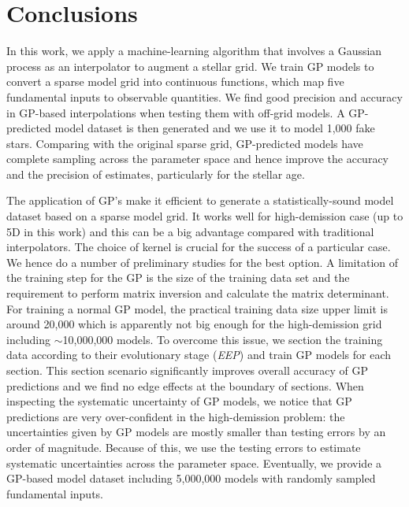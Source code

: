 \section{Conclusions}\label{sec:conclusion}

In this work, we apply a machine-learning algorithm that involves a Gaussian process as an interpolator to augment a stellar grid. We train GP models to convert a sparse model grid into continuous functions, which map five fundamental inputs to observable quantities. We find good precision and accuracy in GP-based interpolations when testing them with off-grid models. A GP-predicted model dataset is then generated and we use it to model 1,000 fake stars. Comparing with the original sparse grid, GP-predicted models have complete sampling across the parameter space and hence improve the accuracy and the precision of estimates, particularly for the stellar age.

The application of GP's make it efficient to generate a statistically-sound model dataset based on a sparse model grid. It works well for high-demission case (up to 5D in this work) and this can be a big advantage compared with traditional interpolators. The choice of kernel is crucial for the success of a particular case. We hence do a number of preliminary studies for the best option. A limitation of the training step for the GP is the size of the training data set and the requirement to perform matrix inversion and calculate the matrix determinant. For training a normal GP model, the practical training data size upper limit is around 20,000 which is apparently not big enough for the high-demission grid including $\sim$10,000,000 models. To overcome this issue, we section the training data according to their evolutionary stage ({\it EEP}) and train GP models for each section. This section scenario significantly improves overall accuracy of GP predictions and we find no edge effects at the boundary of sections. When inspecting the systematic uncertainty of GP models, we notice that GP predictions are very over-confident in the high-demission problem: the uncertainties given by GP models are mostly smaller than testing errors by an order of magnitude. Because of this,  we use the testing errors to estimate systematic uncertainties across the parameter space. Eventually, we provide a GP-based model dataset including 5,000,000 models with randomly sampled fundamental inputs.

